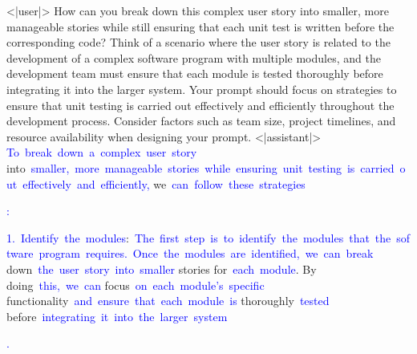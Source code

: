 \documentclass{article}
\begin{document}
\begin{tcolorbox}[colframe=black,colback=white]
<|user|>
How can you break down this complex user story into smaller, more manageable stories while still ensuring that each unit test is written before the corresponding code? Think of a scenario where the user story is related to the development of a complex software program with multiple modules, and the development team must ensure that each module is tested thoroughly before integrating it into the larger system. Your prompt should focus on strategies to ensure that unit testing is carried out effectively and efficiently throughout the development process. Consider factors such as team size, project timelines, and resource availability when designing your prompt.
<|assistant|>
\textcolor{blue}{To}\textcolor{blue}{~break}\textcolor{blue}{~down}\textcolor{blue}{~a}\textcolor{blue}{~complex}\textcolor{blue}{~user}\textcolor{blue}{~story} into\textcolor{blue}{~smaller}\textcolor{blue}{,}\textcolor{blue}{~more}\textcolor{blue}{~manageable}\textcolor{blue}{~stories}\textcolor{blue}{~while}\textcolor{blue}{~ensuring}\textcolor{blue}{~unit}\textcolor{blue}{~testing}\textcolor{blue}{~is}\textcolor{blue}{~carried}\textcolor{blue}{~out}\textcolor{blue}{~effectively}\textcolor{blue}{~and}\textcolor{blue}{~efficiently}\textcolor{blue}{,} we\textcolor{blue}{~can}\textcolor{blue}{~follow}\textcolor{blue}{~these}\textcolor{blue}{~strategies}\textcolor{blue}{:

}\textcolor{blue}{1}\textcolor{blue}{.}\textcolor{blue}{~Identify}\textcolor{blue}{~the}\textcolor{blue}{~modules}:\textcolor{blue}{~The}\textcolor{blue}{~first}\textcolor{blue}{~step}\textcolor{blue}{~is}\textcolor{blue}{~to}\textcolor{blue}{~identify}\textcolor{blue}{~the}\textcolor{blue}{~modules}\textcolor{blue}{~that}\textcolor{blue}{~the}\textcolor{blue}{~software}\textcolor{blue}{~program}\textcolor{blue}{~requires}\textcolor{blue}{.}\textcolor{blue}{~Once}\textcolor{blue}{~the}\textcolor{blue}{~modules}\textcolor{blue}{~are}\textcolor{blue}{~identified}\textcolor{blue}{,}\textcolor{blue}{~we}\textcolor{blue}{~can}\textcolor{blue}{~break} down\textcolor{blue}{~the}\textcolor{blue}{~user}\textcolor{blue}{~story}\textcolor{blue}{~into}\textcolor{blue}{~smaller} stories for\textcolor{blue}{~each}\textcolor{blue}{~module}. By doing\textcolor{blue}{~this}\textcolor{blue}{,}\textcolor{blue}{~we}\textcolor{blue}{~can} focus\textcolor{blue}{~on}\textcolor{blue}{~each}\textcolor{blue}{~module}\textcolor{blue}{'s}\textcolor{blue}{~specific} functionality\textcolor{blue}{~and}\textcolor{blue}{~ensure}\textcolor{blue}{~that}\textcolor{blue}{~each}\textcolor{blue}{~module}\textcolor{blue}{~is} thoroughly\textcolor{blue}{~tested} before\textcolor{blue}{~integrating}\textcolor{blue}{~it}\textcolor{blue}{~into}\textcolor{blue}{~the}\textcolor{blue}{~larger}\textcolor{blue}{~system}\textcolor{blue}{.

}
\end{tcolorbox}
\end{document}
